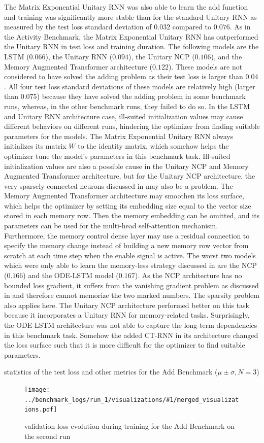 \documentclass[draft,final]{vutinfth} %
\newcommand{\benchmarksummary}[2]{
    \begin{table}
        \centering{}
        \resizebox{\linewidth}{!}{\csvautotabular[options]{../benchmark_logs/statistics/#1.csv}}
        \caption{statistics of the test loss and other metrics for the #2 Benchmark ($\mu \pm \sigma, N=3$)}
        \label{tab:test_loss_#1}
    \end{table}
    \begin{figure}[h]
        \centering{}
        \texttt{[image: ../benchmark\_logs/run\_1/visualizations/\#1/merged\_visualizations.pdf]}
        \caption{validation loss evolution during training for the #2 Benchmark on the second run}
        \label{fig:validation_loss_#1}
    \end{figure}
    \clearpage{}
}
\begin{document}
    The Matrix Exponential Unitary RNN was also able to learn the add function and training was significantly more stable than for the standard Unitary RNN as measured by the test loss standard deviation of $0.032$ compared to $0.076$.
    As in the Activity Benchmark, the Matrix Exponential Unitary RNN has outperformed the Unitary RNN in test loss and training duration.
    The following models are the LSTM ($0.066$), the Unitary RNN ($0.094$), the Unitary NCP ($0.106$), and the Memory Augmented Transformer architecture ($0.122$).
    These models are not considered to have solved the adding problem as their test loss is larger than $0.04$.
    All four test loss standard deviations of these models are relatively high (larger than $0.075$) because they have solved the adding problem in some benchmark runs, whereas, in the other benchmark runs, they failed to do so.
    In the LSTM and Unitary RNN architecture case, ill-suited initialization values may cause different behaviors on different runs, hindering the optimizer from finding suitable parameters for the models.
    The Matrix Exponential Unitary RNN always initializes its matrix $W$ to the identity matrix, which somehow helps the optimizer tune the model's parameters in this benchmark task.
    Ill-suited initialization values are also a possible cause in the Unitary NCP and Memory Augmented Transformer architecture, but for the Unitary NCP architecture, the very sparsely connected neurons discussed in  may also be a problem.
    The Memory Augmented Transformer architecture may smoothen its loss surface, which helps the optimizer by setting its embedding size equal to the vector size stored in each memory row.
    Then the memory embedding can be omitted, and its parameters can be used for the multi-head self-attention mechanism.
    Furthermore, the memory control dense layer may use a residual connection to specify the memory change instead of building a new memory row vector from scratch at each time step when the enable signal is active.
    The worst two models which were only able to learn the memory-less strategy discussed in  are the NCP ($0.166$) and the ODE-LSTM model ($0.167$).
    As the NCP architecture has no bounded loss gradient, it suffers from the vanishing gradient problem as discussed in \cite[p. 2]{NCP} and therefore cannot memorize the two marked numbers.
    The sparsity problem also applies here.
    The Unitary NCP architecture performed better on this task because it incorporates a Unitary RNN for memory-related tasks.
    Surprisingly, the ODE-LSTM architecture was not able to capture the long-term dependencies in this benchmark task.
    Somehow the added CT-RNN in its architecture changed the loss surface such that it is more difficult for the optimizer to find suitable parameters.
    \benchmarksummary{add}{Add}
\end{document}
